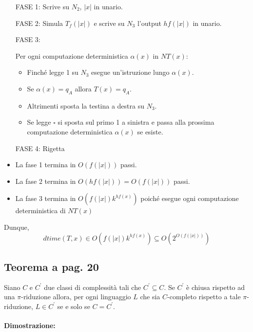 \begin{itemize}
    \item [FASE 1:] Scrive su $N_{2}$, $|x|$ in unario.
    \item [FASE 2:] {
        Simula $T_{f}(|x|)$ e scrive su $N_{3}$ l'output $hf(|x|)$ in unario.
    }
    \item [FASE 3:] {
        Per ogni computazione deterministica $\alpha(x)$ in $NT(x)$:
        \begin{itemize}
            \item Finché legge 1 su $N_{3}$ esegue un'istruzione lungo $\alpha(x)$.
            \item Se $\alpha(x) = q_{A}$ allora $T(x) = q_{A}$.
            \item Altrimenti sposta la testina a destra su $N_{3}$.
            \item Se legge $\square$ si sposta sul primo 1 a sinistra e passa alla prossima computazione deterministica $\alpha(x)$ se esiste.
        \end{itemize}
    }
    \item [FASE 4:] Rigetta
\end{itemize}

\begin{itemize}
    \item La fase 1 termina in $O(f(|x|))$ passi.
    \item La fase 2 termina in $O(hf(|x|)) = O(f(|x|))$ passi.
    \item La fase 3 termina in $O(f(|x|)k^{hf(x)})$ poiché esegue ogni computazione deterministica di $NT(x)$
\end{itemize}

Dunque, $$dtime(T, x) \in O(f(|x|)k^{hf(x)}) \subseteq{O(2^{O(f(|x|))})}$$

\subsection{Teorema a pag. 20}

Siano $C$ e $C^{'}$ due classi di complessità tali che $C^{'} \subseteq C$. Se $C^{'}$ è chiusa rispetto ad una $\pi$-riduzione
allora, per ogni linguaggio $L$ che sia $C$-completo rispetto a tale $\pi$-riduzione, $L \in C^{'}$ se e solo se $C = C^{'}$.

\paragraph*{Dimostrazione:}

